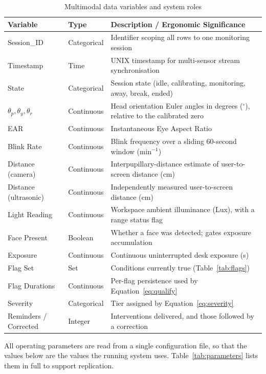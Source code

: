 \begin{table}[htbp]
\centering
\caption{Multimodal data variables and system roles}
\label{tab:data_variables}
\begin{tabular}{@{}llp{7.2cm}@{}}
\toprule
\textbf{Variable} & \textbf{Type} & \textbf{Description / Ergonomic Significance} \\
\midrule
Session\_ID        & Categorical & Identifier scoping all rows to one monitoring session \\
Timestamp          & Time        & UNIX timestamp for multi-sensor stream synchronisation \\
State              & Categorical & Session state (idle, calibrating, monitoring, away, break, ended) \\
$\theta_p, \theta_y, \theta_r$ & Continuous & Head orientation Euler angles in degrees ($^\circ$), relative to the calibrated zero \\
EAR                & Continuous & Instantaneous Eye Aspect Ratio \\
Blink Rate         & Continuous & Blink frequency over a sliding 60-second window ($\text{min}^{-1}$) \\
Distance (camera)  & Continuous & Interpupillary-distance estimate of user-to-screen distance (cm) \\
Distance (ultrasonic) & Continuous & Independently measured user-to-screen distance (cm) \\
Light Reading      & Continuous & Workspace ambient illuminance (Lux), with a range status flag \\
Face Present       & Boolean    & Whether a face was detected; gates exposure accumulation \\
Exposure           & Continuous & Continuous uninterrupted desk exposure (s) \\
Flag Set           & Set        & Conditions currently true (Table~\ref{tab:flags}) \\
Flag Durations     & Continuous & Per-flag persistence used by Equation~\ref{eq:qualify} \\
Severity           & Categorical & Tier assigned by Equation~\ref{eq:severity} \\
Reminders / Corrected & Integer & Interventions delivered, and those followed by a correction \\
\bottomrule
\end{tabular}
\end{table}

All operating parameters are read from a single configuration file, so that the values below are
the values the running system uses. Table~\ref{tab:parameters} lists them in full to support
replication.

